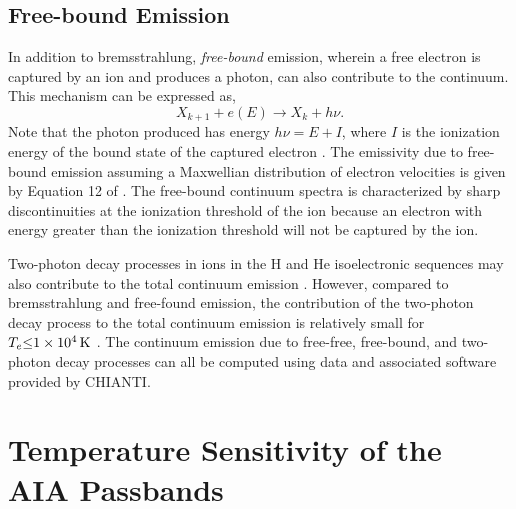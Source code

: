 \subsection{Free-bound Emission}

In addition to bremsstrahlung, \textit{free-bound} emission, wherein a free electron is captured by an ion and produces a photon, can also contribute to the continuum. This mechanism can be expressed as,
\begin{equation}\label{eq:free_bound_process}
    X_{k+1} + e(E) \to X_{k} + h\nu.
\end{equation}
Note that the photon produced has energy $h\nu=E+I$, where $I$ is the ionization energy of the bound state of the captured electron \citep{del_zanna_solar_2018}. The emissivity due to free-bound emission assuming a Maxwellian distribution of electron velocities is given by Equation 12 of \citet{young_chianti-atomic_2003}. The free-bound continuum spectra is characterized by sharp discontinuities at the ionization threshold of the ion because an electron with energy greater than the ionization threshold will not be captured by the ion. 

Two-photon decay processes in ions in the H and He isoelectronic sequences may also contribute to the total continuum emission \citep{young_chianti-atomic_2003}. However, compared to bremsstrahlung and free-found emission, the contribution of the two-photon decay process to the total continuum emission is relatively small for $T_e\SI{\le 1e4}{\kelvin}$ \citep{del_zanna_solar_2018}. The continuum emission due to free-free, free-bound, and two-photon decay processes can all be computed using data and associated software provided by CHIANTI.

\section{Temperature Sensitivity of the AIA Passbands}\label{sec:aia_response}

